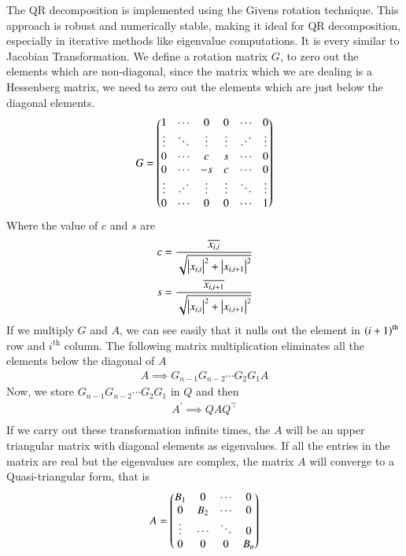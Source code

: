 \documentclass[journal]{IEEEtran}
\begin{document}
The QR decomposition is implemented using the Givens rotation technique. This approach is robust and numerically stable, making it ideal for QR decomposition, especially in iterative methods like eigenvalue computations. It is every similar to Jacobian Transformation. We define a rotation matrix $G$, to zero out the elements which are non-diagonal, since the matrix which we are dealing is a Hessenberg matrix, we need to zero out the elements which are just below the diagonal elements.
\begin{align}
G = \myvec{
1 & \cdots & 0 & 0 & \cdots & 0 \\
\vdots & \ddots & \vdots & \vdots & \reflectbox{$\ddots$} & \vdots \\
0 & \cdots & c & s & \cdots & 0\\
0 & \cdots & -s & c & \cdots & 0\\
\vdots & \reflectbox{$\ddots$} & \vdots & \vdots & \ddots & \vdots\\
0 & \cdots & 0 & 0 & \cdots & 1
}
\end{align}
Where the value of $c$ and $s$ are
\begin{align}
	c = \frac{\overline{x_{i,i}}}{\sqrt{\left\vert x_{i,i}\right\vert^2+\left\vert x_{i,i+1}\right\vert^2}}\\
	s = \frac{\overline{x_{i,i+1}}}{\sqrt{\left\vert x_{i,i}\right\vert^2+\left\vert x_{i,i+1}\right\vert^2}}
\end{align}
If we multiply $G$ and $A$, we can see easily that it nulls out the element in $\left(i+1\right)^{\text{th}}$ row and $i^\text{th}$ column. The following matrix multiplication eliminates all the elements below the diagonal of $A$
\begin{align}
	A \implies G_{n-1}G_{n-2}\cdots G_2G_1A
\end{align}
Now, we store $G_{n-1}G_{n-2}\cdots G_2G_1$ in $Q$ and then
\begin{align}
	A^\prime \implies QAQ^\top\\
\end{align}
If we carry out these transformation infinite times, the $A$ will be an upper triangular matrix with diagonal elements as eigenvalues.
If all the entries in the matrix are real but the eigenvalues are complex, the matrix $A$ will converge to a Quasi-triangular form, that is
\begin{align}
	A = \begin{pmatrix}B_1 & 0 & \cdots & 0 \\
		   0 & B_2 & \cdots & 0\\
		   \vdots & \cdots & \ddots & 0\\
		   0 & 0 & 0 & B_n\end{pmatrix}
\end{align}
\end{document}
